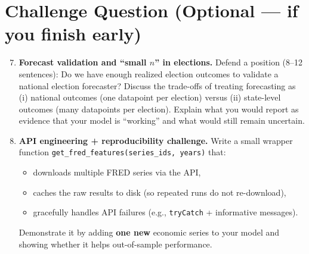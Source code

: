 \documentclass[11pt]{article}
\begin{document}
\section*{Challenge Question (Optional --- if you finish early)}

\begin{enumerate}
\setcounter{enumi}{6}

  \item \textbf{Forecast validation and ``small $n$'' in elections.}
  Defend a position (8--12 sentences): Do we have enough realized election outcomes to validate a national election forecaster?
  Discuss the trade-offs of treating forecasting as (i) national outcomes (one datapoint per election) versus (ii) state-level outcomes (many datapoints per election).
  Explain what you would report as evidence that your model is ``working'' and what would still remain uncertain.

  \item \textbf{API engineering + reproducibility challenge.}
  Write a small wrapper function \texttt{get\_fred\_features(series\_ids, years)} that:
  \begin{itemize}
    \item downloads multiple FRED series via the API,
    \item caches the raw results to disk (so repeated runs do not re-download),
    \item gracefully handles API failures (e.g., \texttt{tryCatch} + informative messages).
  \end{itemize}
  Demonstrate it by adding \textbf{one new} economic series to your model and showing whether it helps out-of-sample performance.
\end{enumerate}
\end{document}
